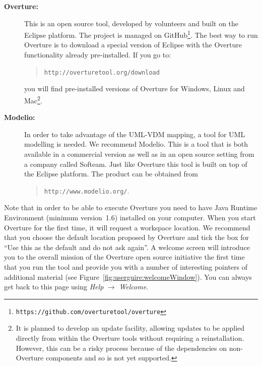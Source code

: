 \documentclass{overturerepchap}
\newcommand{\url}[1]{\texttt{#1}}
\begin{document}
\begin{description}
\item[\textbf{Overture:}] This
 is an open source tool, developed by volunteers and built on
the Eclipse platform. The project is managed on
GitHub\footnote{\url{https://github.com/overturetool/overture}}.
The best way to run Overture is to download a special version of
Eclipse with the Overture functionality already pre-installed. If you
go to:
  \begin{quote}
  \url{http://overturetool.org/download}
  \end{quote}
  \noindent you will find pre-installed versions of Overture for
  Windows, Linux and Mac\footnote{It is planned to develop an update
    facility, allowing updates to be applied directly from within the
    Overture tools without requiring a reinstallation. However, this
    can be a risky process because of the dependencies on non-Overture
    components and so is not yet supported.}.

  \item[\textbf{Modelio:}]   In order to take advantage of the UML-VDM mapping,
      a tool for UML modelling is needed. We recommend Modelio. This is a tool that
      is both available in a commercial version as well as in an open source
      setting from a company called Softeam. Just like Overture this tool is
      built on top of the Eclipse platform. The product can be obtained from
\begin{quote}
\url{http://www.modelio.org/}.
\end{quote}
\end{description}

Note that in order to be able
to execute Overture you need to have Java Runtime Environment (minimum
version~1.6) installed on your computer.
When you start Overture for the first time, it will request a workspace
location. We recommend that you choose the default location proposed
by Overture and tick the box for ``Use this as the default and do
not ask again''. A welcome screen will introduce you to the overall
mission of the Overture open source initiative the first time that you
run the tool and provide you with a number of interesting pointers of
additional material (see
Figure~\ref{fig:userguire:welcomeWindow}). You
can always get back to this page using \emph{Help} $ \rightarrow$
\emph{Welcome}.
\end{document}
